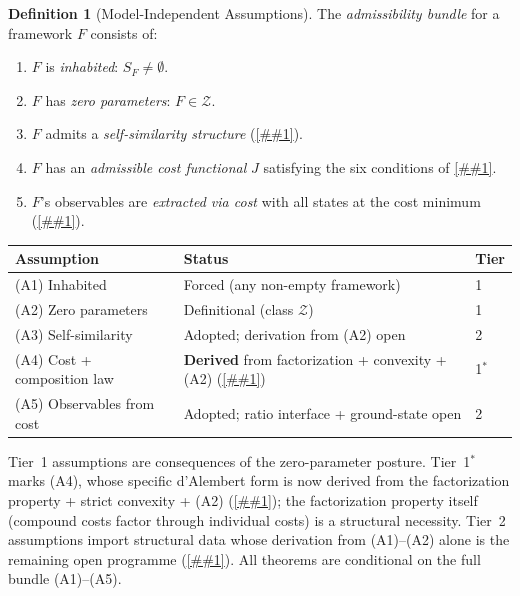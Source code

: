 \documentclass[11pt]{article}
\providecommand{\cref}[1]{\ref{##1}}%
\newcommand{\cZ}{\mathcal{Z}}
\theoremstyle{definition}
\newtheorem{definition}[theorem]{Definition}
\theoremstyle{remark}
\begin{document}
\begin{definition}[Model-Independent Assumptions]\label{def:assumptions}
The \emph{admissibility bundle} for a framework $F$ consists of:
\begin{enumerate}
\item[\textup{(A1)}] $F$ is \emph{inhabited}: $S_F \neq \emptyset$.
\item[\textup{(A2)}] $F$ has \emph{zero parameters}: $F \in \cZ$.
\item[\textup{(A3)}] $F$ admits a \emph{self-similarity structure}
  (\cref{def:self-sim}).
\item[\textup{(A4)}] $F$ has an \emph{admissible cost functional} $J$
  satisfying the six conditions of \cref{def:admissible-cost}.
\item[\textup{(A5)}] $F$'s observables are \emph{extracted via cost}
  with all states at the cost minimum
  (\cref{def:obs-from-cost,def:measure-by-cost}).
\end{enumerate}
\end{definition}

\medskip
\begin{center}
\renewcommand{\arraystretch}{1.15}
\begin{tabular}{lll}
\hline
\textbf{Assumption} & \textbf{Status} & \textbf{Tier} \\
\hline
(A1) Inhabited & Forced (any non-empty framework) & 1 \\
(A2) Zero parameters & Definitional (class $\cZ$) & 1 \\
(A3) Self-similarity & Adopted; derivation from (A2) open & 2 \\
(A4) Cost + composition law & \textbf{Derived} from factorization + convexity + (A2) (\cref{thm:b2-closure}) & 1$^*$ \\
(A5) Observables from cost & Adopted; ratio interface + ground-state open & 2 \\
\hline
\end{tabular}
\end{center}

\medskip\noindent
Tier~1 assumptions are consequences of the zero-parameter posture.
Tier~1$^*$ marks (A4), whose specific d'Alembert form is now
derived from the factorization property + strict convexity + (A2)
(\cref{thm:b2-closure}); the factorization property itself
(compound costs factor through individual costs) is a structural
necessity.
Tier~2 assumptions import structural data whose derivation from
(A1)--(A2) alone is the remaining open programme
(\cref{sec:bridges}).
All theorems are conditional on the full bundle (A1)--(A5).
\end{document}
